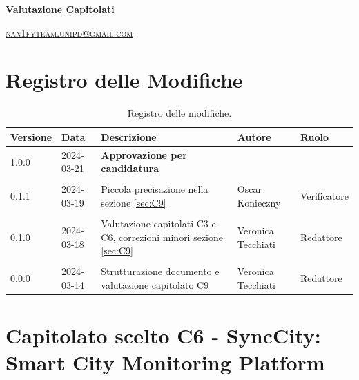 \documentclass[8pt]{article}
\begin{document}
\begin{titlepage}
\begin{minipage}[t]{0.47\textwidth}
{		}
		\vspace{4mm}\vspace{4mm}
	\end{minipage}
	\vspace{4cm}
	\begin{center}
		\begin{flushright}
			{\fontsize{30pt}{52pt}\selectfont \textbf{Valutazione Capitolati}} %
		\end{flushright}
		\vspace{3cm}
	\end{center}
	\vspace{10cm}
	{\small \textsc{\href{mailto: nan1fyteam.unipd@gmail.com}{nan1fyteam.unipd@gmail.com}}}
\end{titlepage}
\pagestyle{mystyle}
\section*{Registro delle Modifiche}
\begin{table}[ht!]	
	\centering
	\begin{tabular}{p{1.2cm} p{2cm} p{6cm} p{3cm} p{2cm}}
		\toprule
		\textbf{Versione}& \textbf{Data} & \textbf{Descrizione} & \textbf{Autore} & \textbf{Ruolo} \\
		\midrule
		1.0.0 & 2024-03-21 & \textbf{Approvazione per candidatura} &  & \\\\
		0.1.1 & 2024-03-19 & Piccola precisazione nella sezione \ref{sec:C9} & Oscar Konieczny & Verificatore
		\\\\ %
		0.1.0 & 2024-03-18 & Valutazione capitolati C3 e C6, correzioni minori sezione \ref{sec:C9} & Veronica Tecchiati & Redattore 
		\\\\ %
		0.0.0 & 2024-03-14 & Strutturazione documento e valutazione capitolato C9 & Veronica Tecchiati & Redattore \\
		\bottomrule
	\end{tabular}
	\caption{Registro delle modifiche.}
	\label{table:Registro delle modifiche}
\end{table}
\newpage
{ \hypersetup{hidelinks} \tableofcontents }
\clearpage
\newpage
\justifying
{}
\section{Capitolato scelto C6 - SyncCity: Smart City Monitoring Platform}
\end{document}

